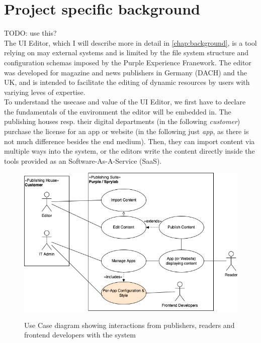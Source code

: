 \section{Project specific background}


TODO: use this?
\\
The UI Editor, which I will describe more in detail in \ref{chap:background}, is a tool relying on may external systems and is limited by the file system structure and configuration schemas imposed by the Purple Experience Franework. The editor was developed for magazine and news publishers in Germany (DACH) and the UK, and is intended to facilitate the editing of dynamic resources by users with variying leves of expertise.
\\

To understand the usecase and value of the UI Editor, we first have to declare the fundamentals of the environment the editor will be embedded in.
The publishing houses resp. their digital departments (in the following \textit{customer}) purchase the license for an app or website (in the following just \textit{app}, as there is not much difference besides the end medium).
Then, they can import content via multiple ways into the system, or the editors write the content directly inside the tools provided as an Software-As-A-Service (SaaS).

\begin{figure}[h]
  \caption{Use Case diagram showing interactions from publishers, readers and frontend developers with the system}
  \includegraphics[width=\textwidth]{pics/purple-abstract.drawio.png}
  \label{fig:usecase1}
\end{figure}

